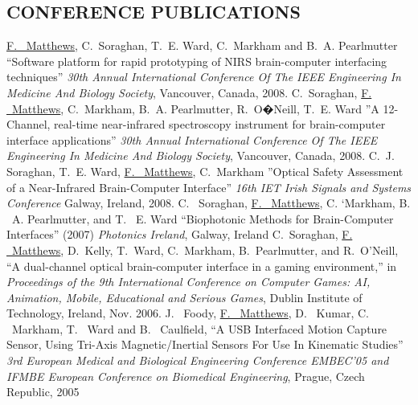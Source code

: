 \subsection{\small{CONFERENCE PUBLICATIONS}}
\underline{F. ~Matthews}, C.~Soraghan, T.~E. Ward, C.~Markham and B.~A. Pearlmutter
   ``Software platform for rapid prototyping of NIRS brain-computer interfacing techniques''
   \emph{30th Annual International Conference Of The IEEE Engineering In Medicine And Biology Society}, Vancouver,
   Canada, 2008.
\linebreak
\linebreak
C.~Soraghan, \underline{F. ~Matthews}, C.~Markham, B.~A. Pearlmutter, R.~O�Neill, T.~E. Ward
   ''A 12-Channel, real-time near-infrared spectroscopy instrument for brain-computer interface applications''
   \emph{30th Annual International Conference Of The IEEE Engineering In Medicine And Biology Society}, Vancouver,
   Canada, 2008.
\linebreak
\linebreak
C.~J. Soraghan, T.~E. Ward, \underline{F. ~Matthews}, C.~Markham
   ''Optical Safety Assessment of a Near-Infrared Brain-Computer Interface''
   \emph{16th IET Irish Signals and Systems Conference} Galway, Ireland, 2008.
\linebreak
\linebreak
C. ~Soraghan, \underline{F. ~Matthews}, C. `Markham, B. ~A. Pearlmutter, and T. ~E. Ward
   ``Biophotonic Methods for Brain-Computer Interfaces''  (2007)
   \emph{Photonics Ireland}, Galway, Ireland
\linebreak
\linebreak
C.~Soraghan, \underline{F. ~Matthews}, D.~Kelly, T.~Ward, C.~Markham, B.~Pearlmutter, and
  R.~O'Neill, ``A dual-channel optical brain-computer interface in a gaming
  environment,'' in \emph{Proceedings of the 9th International Conference on
  Computer Games: AI, Animation, Mobile, Educational and Serious Games}, Dublin
  Institute of Technology, Ireland, Nov. 2006.
\linebreak
\linebreak
J. ~Foody, \underline{F. ~Matthews}, D. ~Kumar, C. ~Markham, T. ~Ward and B. ~Caulfield,
   ``A USB Interfaced Motion Capture Sensor, Using Tri-Axis Magnetic/Inertial Sensors For Use In Kinematic Studies''
   \emph{3rd European Medical and Biological Engineering Conference EMBEC'05 and IFMBE European Conference on Biomedical
   Engineering}, Prague, Czech Republic, 2005